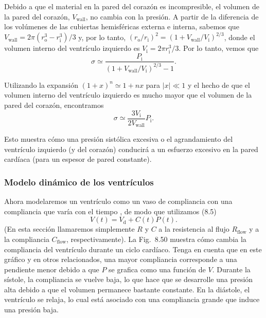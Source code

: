 \documentclass[12pt]{book}
\begin{document}
Debido a que el material en la pared del corazón es incompresible, el volumen de la pared del corazón, $V_{\text{wall}}$, no cambia con la presión. A partir de la diferencia de los volúmenes de las cubiertas hemisféricas externa e interna, sabemos que $V_{\text{wall}} = 2\pi (r_{\text{o}}^3 - r_{\text{i}}^3)/3$ y, por lo tanto, $(r_{\text{o}}/r_{\text{i}})^2 = (1 + V_{\text{wall}}/V_{\text{i}})^{2/3}$, donde el volumen interno del ventrículo izquierdo es $V_{\text{i}} = 2\pi r_{\text{i}}^3/3$. Por lo tanto, vemos que
\begin{equation}
\sigma \simeq \frac{P_{\text{i}}}{(1 + V_{\text{wall}}/V_{\text{i}})^{2/3} - 1}.
\label{eq:855}
\end{equation}

Utilizando la expansión $(1 + x)^n \simeq 1 + nx$ para $|x| \ll 1$ y el hecho de que el volumen interno del ventrículo izquierdo es mucho mayor que el volumen de la pared del corazón, encontramos
\begin{equation}
\sigma \simeq \frac{3 V_{\text{i}}}{2 V_{\text{wall}}} P_{\text{i}}.
\label{eq:856}
\end{equation}

Esto muestra cómo una presión sistólica excesiva o el agrandamiento del ventrículo izquierdo (y del corazón) conducirá a un esfuerzo excesivo en la pared cardíaca (para un espesor de pared constante).

\subsubsection*{Modelo dinámico de los ventrículos}

Ahora modelaremos un ventrículo como un vaso de compliancia con una compliancia que varía con el tiempo \cite{34}, de modo que utilizamos (8.5)
\begin{equation}
V(t) = V_{\text{d}} + C(t) P(t).
\label{eq:857}
\end{equation}
(En esta sección llamaremos simplemente $R$ y $C$ a la resistencia al flujo $R_{\text{flow}}$ y a la compliancia $C_{\text{flow}}$, respectivamente). La Fig.~8.50 muestra cómo cambia la compliancia del ventrículo durante un ciclo cardíaco. Tenga en cuenta que en este gráfico y en otros relacionados, una mayor compliancia corresponde a una pendiente menor debido a que $P$ se grafica como una función de $V$. Durante la sístole, la compliancia se vuelve baja, lo que hace que se desarrolle una presión alta debido a que el volumen permanece bastante constante. En la diástole, el ventrículo se relaja, lo cual está asociado con una compliancia grande que induce una presión baja.
\end{document}
